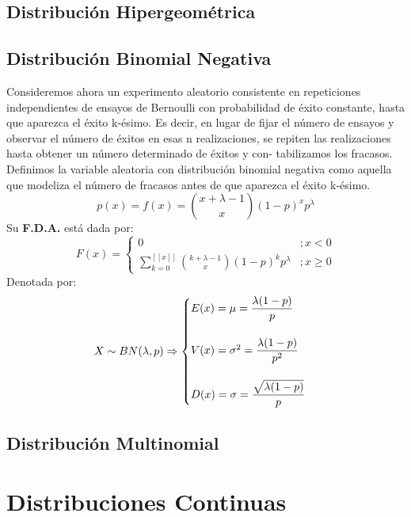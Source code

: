 \subsection{Distribución Hipergeométrica}
\subsection{Distribución Binomial Negativa}
Consideremos ahora un experimento aleatorio consistente en repeticiones independientes de
ensayos de Bernoulli con probabilidad de éxito constante, hasta que aparezca el éxito k-ésimo.
Es decir, en lugar de fijar el número de ensayos y observar el número de éxitos en esas n
realizaciones, se repiten las realizaciones hasta obtener un número determinado de éxitos y con-
tabilizamos los fracasos. Definimos la variable aleatoria con
distribución binomial negativa
como aquella que modeliza el número de fracasos antes de que aparezca el éxito k-ésimo.
$$
p(x)=f(x)=\binom{x+\lambda-1}{x} (1-p)^x p^\lambda
$$
Su \textbf{F.D.A.} está dada por:
$$
F(x)=
\begin{cases}
0 &; x<0 \\
\displaystyle\sum_{k=0}^{[\![ x ]\!]} \binom{k+\lambda-1}{x} (1-p)^k p^\lambda &; x\geq 0
\end{cases}
$$
Denotada por:
$$
X\sim BN(\lambda,p)\Rightarrow
\begin{cases}
E(x)=\mu= \dfrac{\lambda(1-p)}{p} \\ \vspace{0.01cm} \\
V(x)=\sigma^2 = \dfrac{\lambda (1-p)}{p^2}\\ \vspace{0.01cm} \\
D(x)=\sigma= \dfrac{\sqrt{\lambda (1-p)}}{p}
\end{cases}
$$
\subsection{Distribución Multinomial}
\section{Distribuciones Continuas}
